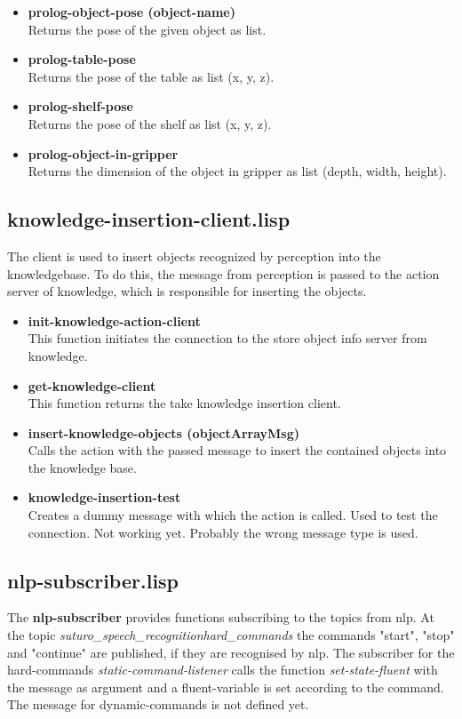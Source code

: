 \documentclass[main.tex]{subfiles}
\begin{document}
\begin{itemize}
				\item \textbf{prolog-object-pose (object-name)} \\ Returns the pose of the given object as list.
				\item \textbf{prolog-table-pose} \\ Returns the pose of the table as list (x, y, z).
				\item \textbf{prolog-shelf-pose} \\ Returns the pose of the shelf as list (x, y, z).
				\item \textbf{prolog-object-in-gripper} \\ Returns the dimension of the object in gripper as list (depth, width, height).
			\end{itemize} 
		\subsection{knowledge-insertion-client.lisp}
		The client is used to insert objects recognized by perception into the knowledgebase. To do this, the message from perception is passed to the action server of knowledge, which is responsible for inserting the objects.
		\begin{itemize}
		  \item \textbf{init-knowledge-action-client} \\
		  This function initiates the connection to the store object info server from knowledge.
		  \item \textbf{get-knowledge-client} \\
		  This function returns the take knowledge insertion client.
		  \item \textbf{insert-knowledge-objects (objectArrayMsg)} \\
		  Calls the action with the passed message to insert the contained objects into the knowledge base.
		  \item \textbf{knowledge-insertion-test} \\
		  Creates a dummy message with which the action is called. Used to test the connection. Not working yet. Probably the wrong message type is used.
		\end{itemize}
		\subsection{nlp-subscriber.lisp}
		The \textbf{nlp-subscriber} provides functions subscribing to the topics from nlp. At the topic \textit{suturo\_speech\_recognition\/hard\_commands} the commands "start", "stop" and "continue" are published, if they are recognised by nlp. The subscriber for the hard-commands \textit{static-command-listener} calls the function \textit{set-state-fluent} with the message as argument and a fluent-variable is set according to the command. The message for dynamic-commands is not defined yet.
\end{document}
